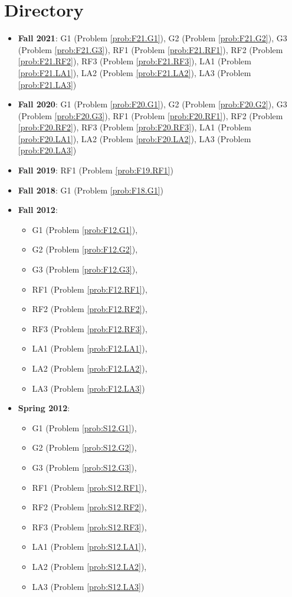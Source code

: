 \documentclass{article}
\theoremstyle{definition}
\begin{document}
\tableofcontents

\section{Directory}

\begin{itemize}
\item \textbf{Fall 2021}: 	G1 (Problem \ref{prob:F21.G1}), 
							G2 (Problem \ref{prob:F21.G2}), 
							G3 (Problem \ref{prob:F21.G3}),
							RF1 (Problem \ref{prob:F21.RF1}),
							RF2 (Problem \ref{prob:F21.RF2}),
							RF3 (Problem \ref{prob:F21.RF3}),
							LA1 (Problem \ref{prob:F21.LA1}),
							LA2 (Problem \ref{prob:F21.LA2}),
							LA3 (Problem \ref{prob:F21.LA3})
\item \textbf{Fall 2020}:  	G1 (Problem \ref{prob:F20.G1}), 
							G2 (Problem \ref{prob:F20.G2}), 
							G3 (Problem \ref{prob:F20.G3}),
							RF1 (Problem \ref{prob:F20.RF1}),
							RF2 (Problem \ref{prob:F20.RF2}),
							RF3 (Problem \ref{prob:F20.RF3}),
							LA1 (Problem \ref{prob:F20.LA1}),
							LA2 (Problem \ref{prob:F20.LA2}),
							LA3 (Problem \ref{prob:F20.LA3})
\item \textbf{Fall 2019}: RF1 (Problem \ref{prob:F19.RF1})
\item \textbf{Fall 2018}: G1 (Problem \ref{prob:F18.G1})
\item \textbf{Fall 2012}:	
	\begin{itemize}
	\item G1 (Problem \ref{prob:F12.G1}), 
	\item G2 (Problem \ref{prob:F12.G2}), 
	\item G3 (Problem \ref{prob:F12.G3}),
	\item RF1 (Problem \ref{prob:F12.RF1}),
	\item RF2 (Problem \ref{prob:F12.RF2}),
	\item RF3 (Problem \ref{prob:F12.RF3}),
	\item LA1 (Problem \ref{prob:F12.LA1}),
	\item LA2 (Problem \ref{prob:F12.LA2}),
	\item LA3 (Problem \ref{prob:F12.LA3})	
	\end{itemize}
\item \textbf{Spring 2012}:  
	\begin{itemize}
	\item G1 (Problem \ref{prob:S12.G1}), 
	\item G2 (Problem \ref{prob:S12.G2}), 
	\item G3 (Problem \ref{prob:S12.G3}),
	\item RF1 (Problem \ref{prob:S12.RF1}),
	\item RF2 (Problem \ref{prob:S12.RF2}),
	\item RF3 (Problem \ref{prob:S12.RF3}),
	\item LA1 (Problem \ref{prob:S12.LA1}),
	\item LA2 (Problem \ref{prob:S12.LA2}),
	\item LA3 (Problem \ref{prob:S12.LA3})	
	\end{itemize}	
	

\end{itemize}
\end{document}
